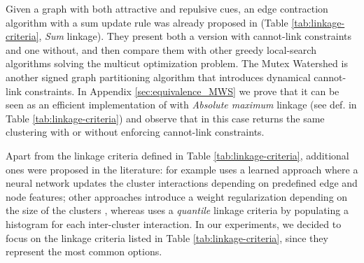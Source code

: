 Given a graph with both attractive and repulsive cues, an edge contraction algorithm with a sum update rule was already proposed in \cite{levinkov2017comparative,keuper2015efficient} (Table \ref{tab:linkage-criteria}, \emph{Sum} linkage). They present both a version with cannot-link constraints and one without, and then compare them with other greedy local-search algorithms solving the multicut optimization problem.
The Mutex Watershed \cite{wolf2018mutex} is another signed graph partitioning algorithm that introduces dynamical cannot-link constraints. In Appendix \ref{sec:equivalence_MWS} we prove that it can be seen as an efficient implementation of \algname{} with \emph{Absolute maximum} linkage (see def. in Table \ref{tab:linkage-criteria}) and observe that in this case \algname{} returns the same clustering with or without enforcing cannot-link constraints.

Apart from the linkage criteria defined in Table \ref{tab:linkage-criteria}, additional ones were proposed in the literature:
\cite{nunez2013machine} for example uses a learned approach where a neural network updates the cluster interactions depending on predefined edge and node features; other approaches introduce a weight regularization depending on the size of the clusters \cite{felzenszwalb2004efficient,kardoostsolving}, whereas 
\cite{funke2018large} uses a \emph{quantile} linkage criteria by populating a histogram for each inter-cluster interaction. In our experiments, we decided to focus on the linkage criteria listed in Table \ref{tab:linkage-criteria}, since they represent the most common options.

